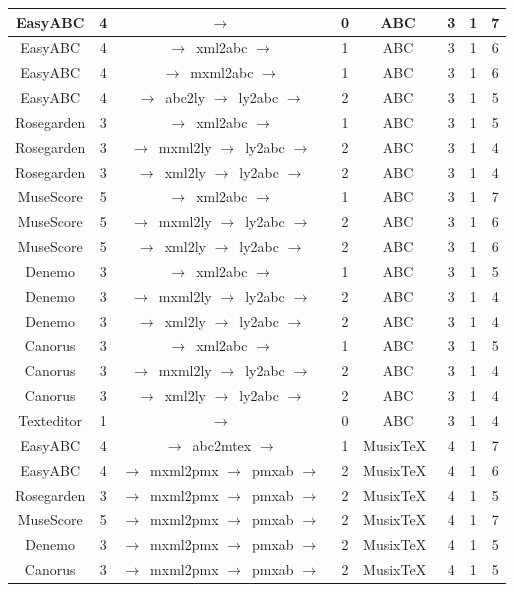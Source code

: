 \documentclass[
  DIV=calc,
  BCOR=5mm,
  11pt,
  headings=small,
  oneside,
  abstract=true,
  toc=bib,
  xcolor=dvipsnames,
  english,ngerman]{scrartcl}
\newcommand{\ra}[0]{$\rightarrow$}
\begin{document}
\begin{small}
\begin{ThreePartTable}
\begin{longtable}{|c|c|c|c|c|c||c||c||}
 Easy\-ABC & 4 & \ra\ & 0 &  ABC & 3 & 1 & 7 \\
\hline
 Easy\-ABC & 4 & \ra\ xml2abc \ra\  & 1 &  ABC & 3 & 1 & 6 \\
\hline
 Easy\-ABC & 4 & \ra\ mxml2abc \ra\  & 1 &  ABC & 3 & 1 & 6 \\
\hline
 Easy\-ABC & 4 & \ra\ abc2ly \ra\ ly2abc \ra\ & 2 &  ABC & 3 & 1 & 5 \\
\hline
 Rose\-garden & 3 & \ra\ xml2abc \ra\ & 1 & ABC & 3 & 1 & 5 \\
\hline 
Rose\-garden & 3 & \ra\ mxml2ly \ra\ ly2abc \ra\ & 2 &  ABC & 3 & 1 &  4 \\
\hline
Rose\-garden & 3 & \ra\ xml2ly \ra\ ly2abc \ra\ & 2 &  ABC & 3 & 1 & 4 \\
\hline
 Muse\-Score & 5 & \ra\ xml2abc \ra\ & 1 & ABC & 3 & 1 & 7 \\
\hline
 Muse\-Score & 5 & \ra\ mxml2ly \ra\ ly2abc \ra\ & 2 &  ABC & 3 & 1 & 6 \\
\hline
 Muse\-Score & 5 & \ra\ xml2ly \ra\ ly2abc \ra\ & 2 &  ABC & 3 & 1 & 6 \\
\hline
 Denemo & 3 & \ra\ xml2abc \ra\ & 1 & ABC & 3 & 1 & 5 \\
\hline
 Denemo & 3 & \ra\ mxml2ly \ra\ ly2abc \ra\ & 2 &  ABC & 3 & 1 & 4 \\
\hline
 Denemo & 3 & \ra\ xml2ly \ra\ ly2abc \ra\ & 2 &  ABC & 3 & 1 &  4 \\
\hline
 Canorus & 3 & \ra\ xml2abc \ra\ & 1 & ABC & 3 & 1 & 5 \\
\hline
 Canorus & 3 & \ra\ mxml2ly \ra\ ly2abc \ra\ & 2 &  ABC & 3 & 1 & 4 \\
\hline
 Canorus & 3 & \ra\ xml2ly \ra\ ly2abc \ra\ & 2 &  ABC & 3 & 1 & 4 \\
\hline
 Texteditor & 1 & \ra\ & 0 &  ABC & 3 & 1 & 4 \\
\hline
\hline
EasyABC & 4 & \ra\ abc2mtex \ra\ & 1 &  Musix\TeX\ & 4 & 1 & 7 \\
\hline
EasyABC & 4 & \ra\ mxml2pmx \ra\ pmxab \ra\ & 2 &  Musix\TeX\ & 4 & 1 & 6 \\
\hline
Rosegarden & 3 & \ra\ mxml2pmx \ra\ pmxab \ra\ & 2 &  Musix\TeX\ & 4 & 1 & 5 \\
\hline
MuseScore & 5 & \ra\ mxml2pmx \ra\ pmxab \ra\ & 2 &  Musix\TeX\ & 4 & 1 & 7 \\
\hline
Denemo & 3 & \ra\ mxml2pmx \ra\ pmxab \ra\ & 2 &  Musix\TeX\ & 4 & 1 & 5 \\
\hline
Canorus & 3 & \ra\ mxml2pmx \ra\ pmxab \ra\ & 2 &  Musix\TeX\ & 4 & 1 & 5 \\

\end{longtable}
\end{ThreePartTable}
\end{small}
\end{document}
